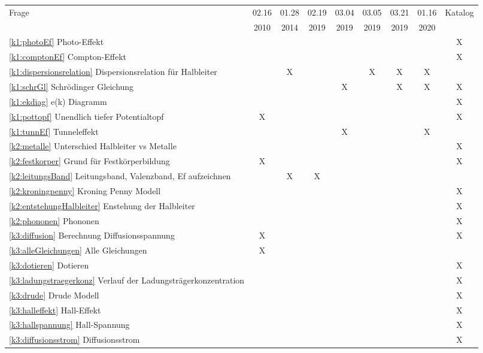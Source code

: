 \documentclass{article}
\begin{document}
\begin{center}
\begin{table}[H]
\begin{adjustbox}{width=\textwidth}
\centering
\begin{tabular}{lcccccccc}
Frage                & 02.16 & 01.28 & 02.19 & 03.04 & 03.05 & 03.21 & 01.16 & Katalog\\
                     & 2010  & 2014  & 2019  & 2019  & 2019  & 2019  & 2020 & \\
                     \hline
\ref{k1:photoEf} Photo-Effekt &&&&&&&& X \\
\ref{k1:comptonEf} Compton-Effekt &&&&&&&& X \\
\ref{k1:dispersionsrelation} Dispersionsrelation für Halbleiter && X &&& X & X & X & \\
\ref{k1:schrGl} Schrödinger Gleichung&&&& X &  & X & X & X \\
\ref{k1:ekdiag} e(k) Diagramm &&&&&&&& X \\
\ref{k1:pottopf} Unendlich tiefer Potentialtopf & X &&&&&&& X \\
\ref{k1:tunnEf} Tunneleffekt&&&& X &&&X & \\
\ref{k2:metalle} Unterschied Halbleiter vs Metalle &&&&&&&& X\\
\ref{k2:festkorper} Grund für Festkörperbildung & X &&&&&&& X\\
\ref{k2:leitungsBand} Leitungsband, Valenzband, Ef aufzeichnen && X & X &&&&& \\
\ref{k2:kroningpenny} Kroning Penny Modell &&&&&&&& X \\
\ref{k2:entstehungHalbleiter} Enstehung der Halbleiter &&&&&&&& X \\
\ref{k2:phononen} Phononen &&&&&&&& X \\
\ref{k3:diffusion} Berechnung Diffusionsspannung & X &&&&&&& X \\
\ref{k3:alleGleichungen} Alle Gleichungen & X &&&&&&& \\
\ref{k3:dotieren} Dotieren &&&&&&&& X \\
\ref{k3:ladungstraegerkonz} Verlauf der Ladungstr\"agerkonzentration &&&&&&&& X \\
\ref{k3:drude} Drude Modell &&&&&&&& X \\
\ref{k3:halleffekt} Hall-Effekt &&&&&&&& X \\
\ref{k3:hallspannung} Hall-Spannung &&&&&&&& X \\
\ref{k3:diffusionsstrom} Diffusionsstrom &&&&&&&& X \\

\end{tabular}
\end{adjustbox}
\end{table}
\end{center}
\end{document}
